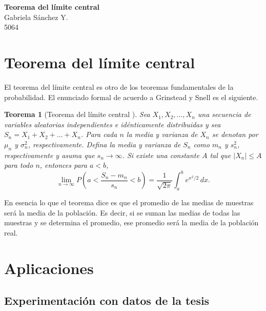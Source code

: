 \documentclass[12pt]{article}
\newtheorem{theorem}{Teorema}
\begin{document}
	\thispagestyle{empty}

	\begin{center}
		{\Large \bf Teorema del límite central}\\
		Gabriela S\'anchez Y.\\
		5064
	\end{center}
  
  	\section{Teorema del límite central}
  	
	El teorema del límite central es otro de los teoremas fundamentales de la probabilidad. El enunciado formal de acuerdo a Grinstead y Snell \cite{prob2003} es el siguiente.
	
	\begin{theorem}[Teorema del límite central ]
		Sea $X_1, X_2, \ldots, X_n$ una secuencia de variables aleatorias independientes e idénticamente distribuidas y sea $S_n = X_1 + X_2 + \ldots + X_n$. Para cada $n$ la media y varianza de $X_n$ se denotan por $\mu_n$ y $\sigma_n^2$, respectivamente. Defina la media y varianza de $S_n$ como $m_n$ y $s_n^2$, respectivamente y asuma que $s_n \rightarrow \infty$. Si existe una constante $A$ tal que $|X_n| \leq A$ para todo $n$, entonces para $a<b$,
		\begin{equation*}
		\lim_{n \rightarrow \infty} P \left( a < \frac{S_n - m_n}{s_n} < b  \right) = \frac{1}{\sqrt{2\pi}} \int_{a}^{b} e^{x^2/2} \, dx.
		\end{equation*}
	\end{theorem}

	En esencia lo que el teorema dice es que el promedio de las medias de muestras será la media de la población. Es decir, si se suman las medias de todas las muestras y se determina el promedio, ese promedio será la media de la población real.

	
	\section{Aplicaciones}
	

	\subsection{Experimentación con datos de la tesis}
	
\end{document}
